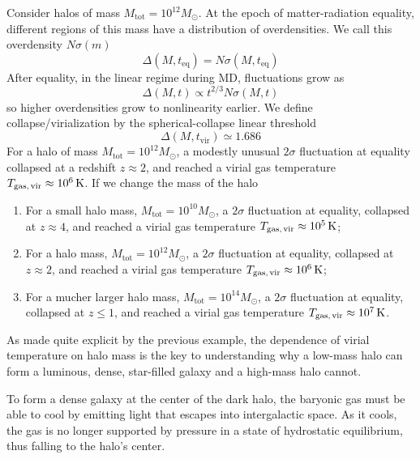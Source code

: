 \begin{tcolorbox}[enhanced,attach boxed title to top center={yshift=-3mm,yshifttext=-1mm},
  colback=blue!5!white,colframe=blue!75!black,colbacktitle=blue!80!black,
  title=Example,
  boxed title style={size=small,colframe=blue!50!black}]
  Consider halos of mass $M_{\text{tot}}=10^{12}M_{\odot}$. At the epoch of matter-radiation equality, different regions of this mass have a distribution of overdensities. We call this overdensity $N\sigma(m)$
  $$ \Delta(M,t_{\text{eq}}) = N\sigma(M,t_{\text{eq}})$$
  After equality, in the linear regime during MD, fluctuations grow as 
  $$ \Delta(M,t) \propto t^{2/3}N\sigma(M,t) $$
  so higher overdensities grow to nonlinearity earlier. We define collapse/virialization by the spherical-collapse linear threshold
  $$ \Delta(M,t_{\text{vir}}) \simeq 1.686$$
  For a halo of mass $M_{\text{tot}}=10^{12}M_{\odot}$, a modestly unusual $2\sigma$ fluctuation at equality collapsed at a redshift $z\approx 2$, and reached a virial gas temperature $T_{\text{gas,\,vir}} \approx 10^{6}\,\text{K}$. If we change the mass of the halo 
  \begin{enumerate}
    \item For a small halo mass, $M_{\text{tot}}=10^{10}M_{\odot}$, a $2\sigma$ fluctuation at equality, collapsed at $z\approx 4$, and reached a virial gas temperature $T_{\text{gas,\,vir}} \approx 10^{5}\,\text{K}$;
    \item For a halo mass, $M_{\text{tot}}=10^{12}M_{\odot}$, a $2\sigma$ fluctuation at equality, collapsed at $z\approx 2$, and reached a virial gas temperature $T_{\text{gas,\,vir}} \approx 10^{6}\,\text{K}$;
    \item For a mucher larger halo mass, $M_{\text{tot}}=10^{14}M_{\odot}$, a $2\sigma$ fluctuation at equality, collapsed at $z\leq 1$, and reached a virial gas temperature $T_{\text{gas,\,vir}} \approx 10^{7}\,\text{K}$.
  \end{enumerate}
\end{tcolorbox}
As made quite explicit by the previous example, the dependence of virial temperature on halo mass is the key to understanding why a low-mass halo can form a luminous, dense, star-filled galaxy and a high-mass halo cannot.
\par To form a dense galaxy at the center of the dark halo, the baryonic gas must be able to cool by emitting light that escapes into intergalactic space. As it cools, the gas is no longer supported by pressure in a state of hydrostatic equilibrium, thus falling to the halo's center.

